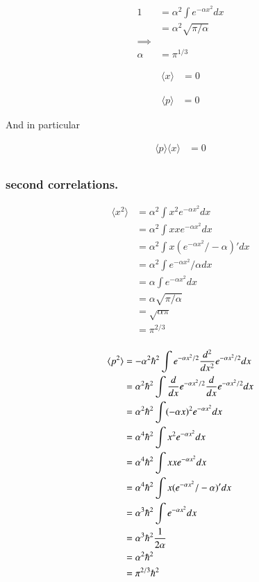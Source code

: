 \documentclass{article}
\newcommand{\expectation}[1]{\langle{#1}\rangle}
\begin{document}
\begin{align*}
1 
&= \alpha^2 \int e^{-\alpha x^2} dx \\
&= \alpha^2 \sqrt{\pi/\alpha} \\
\implies \\
\alpha &= \pi^{1/3}
\end{align*}

\begin{align*}
\expectation{x} &= 0
\end{align*}

\begin{align*}
\expectation{p} &= 0
\end{align*}

And in particular

\begin{align*}
\expectation{p} \expectation{x} &= 0 \\
\end{align*}

\subsubsection{ second correlations. }

\begin{align*}
\expectation{x^2} 
&= \alpha^2 \int x^2 e^{-\alpha x^2} dx \\
&= \alpha^2 \int x x e^{-\alpha x^2} dx \\
&= \alpha^2 \int x (e^{-\alpha x^2}/-\alpha)' dx \\
&= \alpha^2 \int e^{-\alpha x^2}/\alpha dx \\
&= \alpha \int e^{-\alpha x^2} dx \\
&= \alpha \sqrt{\pi/\alpha} \\
&= \sqrt{\alpha \pi} \\
&= \pi^{2/3} \\
\end{align*}

\begin{align*}
\expectation{p^2} 
&= -\alpha^2 \hbar^2 \int e^{-\alpha x^2/2} \frac{d^2}{dx^2} e^{-\alpha x^2/2} dx \\
&= \alpha^2 \hbar^2 \int \frac{d}{dx} e^{-\alpha x^2/2} \frac{d}{dx} e^{-\alpha x^2/2} dx \\
&= \alpha^2 \hbar^2 \int (-\alpha x)^2 e^{-\alpha x^2} dx \\
&= \alpha^4 \hbar^2 \int x^2 e^{-\alpha x^2} dx \\
&= \alpha^4 \hbar^2 \int x x e^{-\alpha x^2} dx \\
&= \alpha^4 \hbar^2 \int x (e^{-\alpha x^2}/-\alpha)' dx \\
&= \alpha^3 \hbar^2 \int e^{-\alpha x^2} dx \\
&= \alpha^3 \hbar^2 \inv{2\alpha} \\
&= \alpha^2 \hbar^2  \\
&= \pi^{2/3} \hbar^2 
\end{align*}
\end{document}
